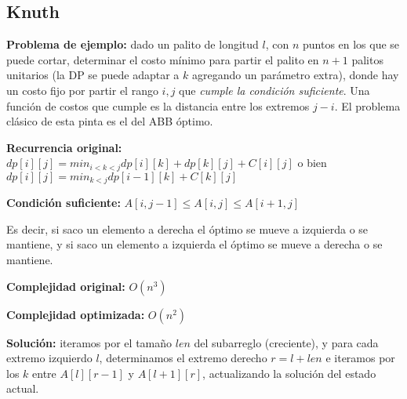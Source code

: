 \subsection{Knuth}
{
    \textbf{Problema de ejemplo:} dado un palito de longitud $l$, con $n$ puntos en los que se puede cortar,
    determinar el costo mínimo para partir el palito en $n+1$ palitos unitarios (la DP se puede adaptar a $k$ 
    agregando un parámetro extra), donde hay un costo fijo por partir el rango $i, j$ que \emph{cumple la 
    condición suficiente}. Una función de costos que cumple es la distancia entre los extremos $j-i$. 
    El problema clásico de esta pinta es el del ABB óptimo.

    \textbf{Recurrencia original:} $dp[i][j] = min_{i < k < j} {dp[i][k] + dp[k][j]} + C[i][j]$ o bien 
		$dp[i][j] = min_{k < j}{dp[i - 1][k] + C[k][j]}$

    \textbf{Condición suficiente:} $A[i, j - 1] \leq  A[i, j] \leq A[i + 1, j]$

    Es decir, si saco un elemento a derecha el óptimo se mueve a izquierda o se mantiene, y 
    si saco un elemento a izquierda el óptimo se mueve a derecha o se mantiene.

    \textbf{Complejidad original:} $O(n^3)$

    \textbf{Complejidad optimizada:} $O(n^2)$

    \textbf{Solución:} iteramos por el tamaño $len$ del subarreglo (creciente), y para cada extremo izquierdo $l$,
    determinamos el extremo derecho $r=l+len$ e iteramos por los $k$ entre $A[l][r-1]$ y $A[l+1][r]$, actualizando la
    solución del estado actual.

}

